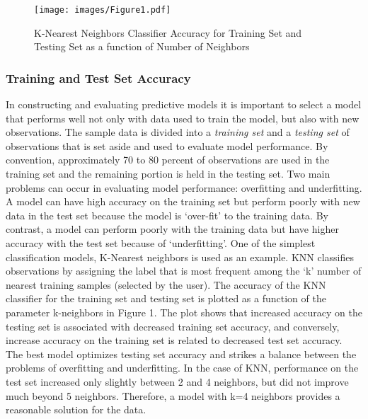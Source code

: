 \documentclass[sigconf]{acmart}
\begin{document}
 \begin{figure}[!ht]
  \centering\texttt{[image: images/Figure1.pdf]}
  \caption{K-Nearest Neighbors Classifier Accuracy for Training Set and 
  Testing Set as a function of Number of Neighbors}
  \label{f:Figure1}
\end{figure}


\subsubsection{Training and Test Set Accuracy}

In constructing and evaluating predictive models it is important to select 
a model that performs well not only with data used to train the model, but 
also with new observations. The sample data is divided into a 
\emph{training set} and a \emph{testing set} of observations that is set aside 
and used to evaluate model performance. By convention, approximately 70 to 80 
percent of observations are used in the training set and the remaining 
portion is held in the testing set. Two main problems can occur in evaluating 
model performance: overfitting and underfitting. A model can have high accuracy 
on the training set but perform poorly with new data in the test set because 
the model is `over-fit' to the training data. By contrast, a model can perform 
poorly with the training data but have higher accuracy with the test set 
because of `underfitting'. One of the simplest classification models, 
K-Nearest neighbors is used as an example. KNN classifies observations by 
assigning the label that is most frequent among the `k' number of nearest 
training samples (selected by the user). The accuracy of the KNN classifier 
for the training set and testing set is plotted as a function of the parameter 
k-neighbors in Figure 1. The plot shows that increased accuracy on the testing 
set is associated with decreased training set accuracy, and conversely, 
increase accuracy on the training set is related to decreased test set accuracy. 
The best model optimizes testing set accuracy and strikes a balance between 
the problems of overfitting and underfitting. In the case of KNN, performance 
on the test set increased only slightly between 2 and 4 neighbors, but did not improve much beyond 5 neighbors. Therefore, a model with k=4 neighbors 
provides a reasonable solution for the data. 

\end{document}
